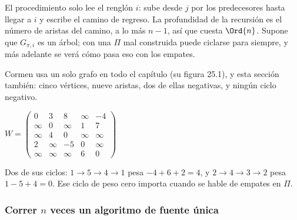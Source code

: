 \documentclass[11pt,letterpaper]{article}
\begin{document}
El procedimiento solo lee el renglón $i$: sube desde $j$ por los
predecesores hasta llegar a $i$ y escribe el camino de regreso. La
profundidad de la recursión es el número de aristas del camino, a lo
más $n - 1$, así que cuesta $\Ord{n}$. Supone que $G_{\pi,i}$ es un
árbol; con una $\Pi$ mal construida puede ciclarse para siempre, y más
adelante se verá cómo pasa eso con los empates.

\begin{ejemplo}
  \label{ej:grafo-pares}
  Cormen usa un solo grafo en todo el capítulo (su figura 25.1), y
  esta sección también: cinco vértices, nueve aristas, dos de ellas
  negativas, y ningún ciclo negativo.
  \begin{center}
  \hspace{1.2cm}
  $W = \begin{pmatrix}
    0 & 3 & 8 & \infty & -4 \\
    \infty & 0 & \infty & 1 & 7 \\
    \infty & 4 & 0 & \infty & \infty \\
    2 & \infty & -5 & 0 & \infty \\
    \infty & \infty & \infty & 6 & 0
  \end{pmatrix}$
  \end{center}
  Dos de sus ciclos: $1 \to 5 \to 4 \to 1$ pesa $-4 + 6 + 2 = 4$, y
  $2 \to 4 \to 3 \to 2$ pesa $1 - 5 + 4 = 0$. Ese ciclo de peso cero
  importa cuando se hable de empates en $\Pi$.
\end{ejemplo}

\subsubsection*{Correr $n$ veces un algoritmo de fuente única}
\end{document}
